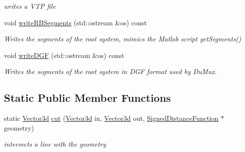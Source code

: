 \begin{DoxyCompactItemize}
\begin{DoxyCompactList}\small\item\em writes a V\+TP file \end{DoxyCompactList}\item 
void \hyperlink{classCPlantBox_1_1SegmentAnalyser_add6618a9caceaadc37b9e52deaa2bec6}{write\+R\+B\+Segments} (std\+::ostream \&os) const
\begin{DoxyCompactList}\small\item\em Writes the segments of the root system, mimics the Matlab script get\+Segments() \end{DoxyCompactList}\item 
void \hyperlink{classCPlantBox_1_1SegmentAnalyser_abda97405b2591f633f44ca5856befeab}{write\+D\+GF} (std\+::ostream \&os) const
\begin{DoxyCompactList}\small\item\em Writes the segments of the root system in D\+GF format used by Du\+Mux. \end{DoxyCompactList}\end{DoxyCompactItemize}
\subsection*{Static Public Member Functions}
\begin{DoxyCompactItemize}
\item 
static \hyperlink{classCPlantBox_1_1Vector3d}{Vector3d} \hyperlink{classCPlantBox_1_1SegmentAnalyser_ab9474e1bfdccb361c6ab7ee2c7ec7dc4}{cut} (\hyperlink{classCPlantBox_1_1Vector3d}{Vector3d} in, \hyperlink{classCPlantBox_1_1Vector3d}{Vector3d} out, \hyperlink{classCPlantBox_1_1SignedDistanceFunction}{Signed\+Distance\+Function} $\ast$geometry)
\begin{DoxyCompactList}\small\item\em intersects a line with the geometry \end{DoxyCompactList}\end{DoxyCompactItemize}
